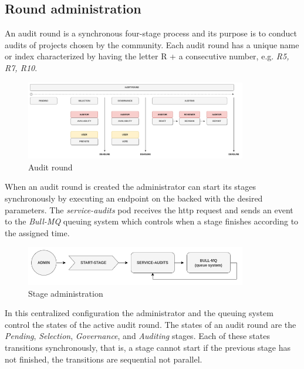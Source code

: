 \documentclass[9pt]{article}
\begin{document}
\subsection { Round administration }

An audit round is a synchronous four-stage process and its purpose is to conduct audits of projects chosen by the community. Each audit round has a unique name or index characterized by having the letter R + a consecutive number, e.g. \emph{R5, R7, R10}. 

\begin{figure}[ht]
  \centering
  \includegraphics[width=0.86\textwidth]{round.png}
  \caption{Audit round}
  \label{fig:mi_imagen}
\end{figure}

When an audit round is created the administrator can start its stages synchronously by executing an endpoint on the backed with the desired parameters. The \emph{service-audits} pod receives the http request and sends an event to the \emph{Bull-MQ} queuing system which controls when a stage finishes according to the assigned time.

\begin{figure}[ht]
  \centering
  \includegraphics[width=0.86\textwidth]{admin.png}
  \caption{Stage administration}
  \label{fig:mi_imagen}
\end{figure}

In this centralized configuration the administrator and the queuing system control the states of the active audit round. The states of an audit round are the \emph{Pending}, \emph{Selection}, \emph{Governance}, and \emph{Auditing} stages. Each of these states transitions synchronously, that is, a stage cannot start if the previous stage has not finished, the transitions are sequential not parallel.
\end{document}
